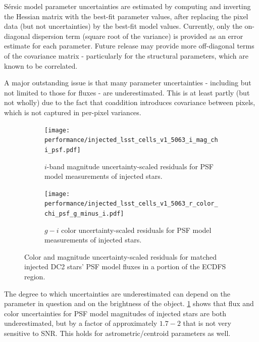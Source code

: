S\'ersic model parameter uncertainties are estimated by computing and inverting the Hessian matrix with the best-fit parameter values, after replacing the pixel data (but not uncertainties) by the best-fit model values.
Currently, only the on-diagonal dispersion term (square root of the variance) is provided as an error estimate for each parameter.
Future release may provide more off-diagonal terms of the covariance matrix - particularly for the structural parameters, which are known to be correlated.

A major outstanding issue is that many parameter uncertainties - including but not limited to those for fluxes - are underestimated.
This is at least partly (but not wholly) due to the fact that coaddition introduces covariance between pixels, which is not captured in per-pixel variances.

\begin{figure}[hbt!]
  \centering
  \begin{subfigure}[t]{0.45\textwidth}
  \texttt{[image: performance/injected\_lsst\_cells\_v1\_5063\_i\_mag\_chi\_psf.pdf]}
  \caption{$i$-band magnitude uncertainty-scaled residuals for PSF model measurements of injected stars.}
  \end{subfigure}\hfill
  \begin{subfigure}[t]{0.45\textwidth}
  \texttt{[image: performance/injected\_lsst\_cells\_v1\_5063\_r\_color\_chi\_psf\_g\_minus\_i.pdf]}
  \caption{$g-i$ color uncertainty-scaled residuals for PSF model measurements of injected stars.}
  \end{subfigure}\hfill
\caption{Color and magnitude uncertainty-scaled residuals for matched injected DC2 stars' PSF model fluxes in a portion of the \gls{ECDFS} region.}
\label{fig:injected_lsst_cells_v1_5063_star_psf_chi}
\vspace{0.1cm}
\end{figure}

The degree to which uncertainties are underestimated can depend on the parameter in question and on the brightness of the object.
\ref{fig:injected_lsst_cells_v1_5063_star_psf_chi} shows that flux and color uncertainties for PSF model magnitudes of injected stars are both underestimated, but by a factor of approximately $1.7-2$ that is not very sensitive to \gls{SNR}.
This holds for astrometric/centroid parameters as well.

